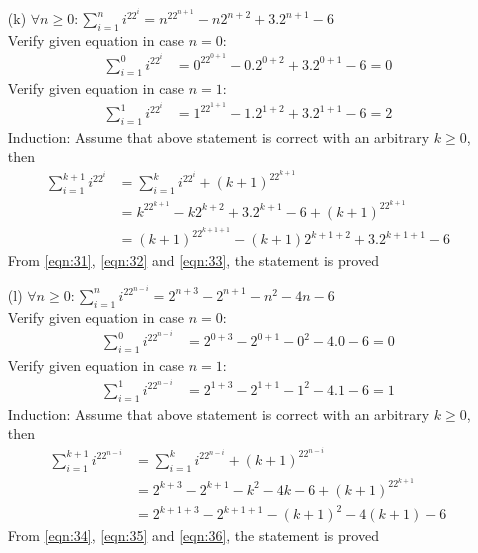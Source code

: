 \begin{enumerate}
    \newpage
    \item[(k)] $\forall n\geq 0: \displaystyle\sum^{n}_{i=1} i^22^i = n^22^{n+1}-n2^{n+2}+3.2^{n+1}-6$ \\
    Verify given equation in case $n=0$:
        \begin{align}
            \displaystyle\sum^{0}_{i=1} i^22^i &= 0^22^{0+1}-0.2^{0+2}+3.2^{0+1}-6 = 0 \label{eqn:31}
        \end{align}
    Verify given equation in case $n=1$:
        \begin{align}
            \displaystyle\sum^{1}_{i=1} i^22^i &= 1^22^{1+1}-1.2^{1+2}+3.2^{1+1}-6 = 2 \label{eqn:32}
        \end{align}
    Induction: Assume that above statement is correct with an arbitrary $k \geq 0$, then\\
    \begin{align}
        \displaystyle\sum^{k+1}_{i=1} i^22^i &= \displaystyle\sum^{k}_{i=1} i^22^i + (k+1)^22^{k+1} \\
                                        &= k^22^{k+1}-k2^{k+2}+3.2^{k+1}-6 + (k+1)^22^{k+1} \\
                                        &= (k+1)^22^{k+1+1}-(k+1)2^{k+1+2}+3.2^{k+1+1}-6 \label{eqn:33}
    \end{align}
    From \ref{eqn:31}, \ref{eqn:32} and \ref{eqn:33}, the statement is proved
    
    \item[(l)] $\forall n\geq 0: \displaystyle\sum^{n}_{i=1} i^22^{n-i} = 2^{n+3}-2^{n+1}-n^2-4n-6$ \\
    Verify given equation in case $n=0$:
        \begin{align}
            \displaystyle\sum^{0}_{i=1} i^22^{n-i} &= 2^{0+3}-2^{0+1}-0^2-4.0-6 = 0 \label{eqn:34}
        \end{align}
    Verify given equation in case $n=1$:
        \begin{align}
            \displaystyle\sum^{1}_{i=1} i^22^{n-i} &= 2^{1+3}-2^{1+1}-1^2-4.1-6 = 1 \label{eqn:35}
        \end{align}
    Induction: Assume that above statement is correct with an arbitrary $k \geq 0$, then\\
    \begin{align}
        \displaystyle\sum^{k+1}_{i=1} i^22^{n-i} &= \displaystyle\sum^{k}_{i=1} i^22^{n-i} + (k+1)^22^{n-i} \\
                                        &= 2^{k+3}-2^{k+1}-k^2-4k-6 + (k+1)^22^{k+1} \\
                                        &= 2^{k+1+3}-2^{k+1+1}-(k+1)^2-4(k+1)-6 \label{eqn:36}
    \end{align}
    From \ref{eqn:34}, \ref{eqn:35} and \ref{eqn:36}, the statement is proved
    

\end{enumerate}
